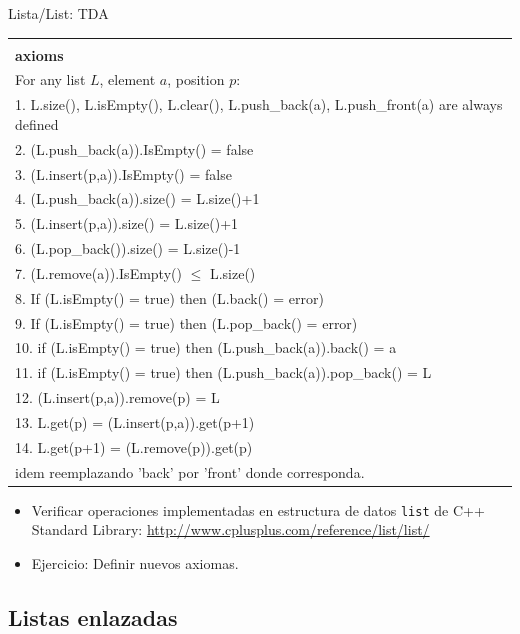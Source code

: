\documentclass{beamer} %
\begin{document}
\begin{frame}{Lista/List: TDA}
    \scriptsize{
    \begin{tabular}{p{87ex}}\hline\\[-1ex]
      {\bf\normalsize axioms}\\
      For any list $L$, element $a$, position $p$:\\[1.2ex]
      1. L.size(), L.isEmpty(), L.clear(), L.push\_back(a), L.push\_front(a) are always defined\\
      2. (L.push\_back(a)).IsEmpty() = false\\
      3. (L.insert(p,a)).IsEmpty() = false\\
      4. (L.push\_back(a)).size() = L.size()+1\\
      5. (L.insert(p,a)).size() = L.size()+1\\
      6. (L.pop\_back()).size() = L.size()-1\\
      7. (L.remove(a)).IsEmpty() $\leq$ L.size()\\
      8. If (L.isEmpty() = true) then (L.back() = error)\\
      9. If (L.isEmpty() = true) then (L.pop\_back() = error)\\
      10. if (L.isEmpty() = true) then (L.push\_back(a)).back() = a\\
      11. if (L.isEmpty() = true) then (L.push\_back(a)).pop\_back() = L\\
      12. (L.insert(p,a)).remove(p) = L\\
      13. L.get(p) = (L.insert(p,a)).get(p+1)\\
      14. L.get(p+1) = (L.remove(p)).get(p)\\
      idem reemplazando 'back' por 'front' donde corresponda.\\[1.5ex]\hline
    \end{tabular}

    \begin{itemize}
        \item<2-> Verificar operaciones implementadas en estructura de datos \texttt{list} de C++ Standard Library: \url{http://www.cplusplus.com/reference/list/list/}
        \item<2-> Ejercicio: Definir nuevos axiomas.
    \end{itemize}}
\end{frame}

\subsection{Listas enlazadas}
\end{document}
